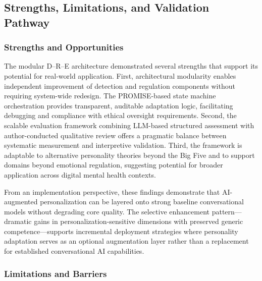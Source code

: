 \subsection{Strengths, Limitations, and Validation Pathway}\label{strengths-limitations-and-validation-pathway}

\subsubsection{Strengths and Opportunities}\label{strengths-and-opportunities}

The modular D--R--E architecture demonstrated several strengths that support its potential for real-world application. First, architectural modularity enables independent improvement of detection and regulation components without requiring system-wide redesign. The PROMISE-based state machine orchestration provides transparent, auditable adaptation logic, facilitating debugging and compliance with ethical oversight requirements. Second, the scalable evaluation framework combining LLM-based structured assessment with author-conducted qualitative review offers a pragmatic balance between systematic measurement and interpretive validation. Third, the framework is adaptable to alternative personality theories beyond the Big Five and to support domains beyond emotional regulation, suggesting potential for broader application across digital mental health contexts.

From an implementation perspective, these findings demonstrate that AI-augmented personalization can be layered onto strong baseline conversational models without degrading core quality. The selective enhancement pattern---dramatic gains in personalization-sensitive dimensions with preserved generic competence---supports incremental deployment strategies where personality adaptation serves as an optional augmentation layer rather than a replacement for established conversational AI capabilities.

\subsubsection{Limitations and Barriers}\label{limitations-and-barriers}

